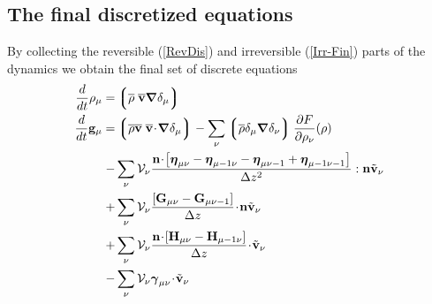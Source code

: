 \documentclass[b5paper,openright,10pt]{book}
\newcommand{\esc}{\!\cdot\!}
\newcommand{\llg}{\left\lgroup}
\newcommand{\rlg}{\right\rgroup}
\begin{document}
\subsection{The final discretized equations}
By   collecting  the   reversible   (\ref{RevDis})  and   irreversible
(\ref{Irr-Fin})  parts of  the dynamics  we  obtain the  final set  of
discrete equations
\begin{align}
\frac{d}{dt}\rho_\mu=&  \llg\overline{\rho} \; \overline{\bf v}\boldsymbol{\nabla}\delta_\mu \rlg
\nonumber\\
\frac{d}{dt}{\bf g}_\mu=&
\llg\overline{\rho} \overline{\bf v}\;\overline{\bf v}\esc\boldsymbol{\nabla}\delta_{\mu}\rlg
-\sum_\nu\llg\overline{\rho}\delta_{\mu}\boldsymbol{\nabla}\delta_{\nu}\rlg
\frac{\partial  F}{\partial \rho_{\nu}}(\rho)
\nonumber\\
-&\sum_{\nu}{\cal V}_\nu \frac{{\bf n}\esc\left[\boldsymbol{\eta}_{\mu\nu}-\boldsymbol{\eta}_{\mu-1\nu}-\boldsymbol{\eta}_{\mu\nu-1}+\boldsymbol{\eta}_{\mu-1\nu-1}\right]}{\Delta z^2}:{\bf n}\tilde{\bf v}_\nu
\nonumber\\
+&\sum_{\nu}{\cal V}_\nu\frac{\left[{\bf G}_{\mu\nu}-{\bf G}_{\mu\nu-1}\right]}{\Delta z}\esc{\bf n}\tilde{\bf v}_\nu
\nonumber\\
+&\sum_{\nu}{\cal V}_\nu\frac{{\bf n}\esc\left[{\bf H}_{\mu\nu}-{\bf H}_{\mu-1\nu}\right]}{\Delta z}\esc\tilde{\bf v}_\nu
\nonumber\\
-&\sum_{\nu}{\cal V}_\nu\boldsymbol{\gamma}_{\mu\nu}\esc\tilde{\bf v}_\nu
\label{TheoryDiscFin}
\end{align}
\end{document}
